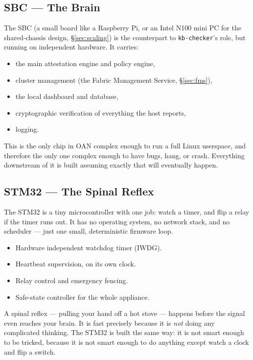 \documentclass[11pt,a4paper]{article}
\begin{document}
\subsection{SBC --- The Brain}
\label{sec:sbc}

The SBC (a small board like a Raspberry Pi, or an Intel N100 mini PC for
the shared-chassis design, \S\ref{sec:scaling}) is the counterpart to
\texttt{kb-checker}'s role, but running on independent hardware. It
carries:

\begin{itemize}
  \item the main attestation engine and policy engine,
  \item cluster management (the Fabric Management Service,
    \S\ref{sec:fms}),
  \item the local dashboard and database,
  \item cryptographic verification of everything the host reports,
  \item logging.
\end{itemize}

This is the only chip in OAN complex enough to run a full Linux
userspace, and therefore the only one complex enough to have bugs, hang,
or crash. Everything downstream of it is built assuming exactly that
will eventually happen.

\subsection{STM32 --- The Spinal Reflex}
\label{sec:stm32}

The STM32 is a tiny microcontroller with one job: watch a timer, and
flip a relay if the timer runs out. It has no operating system, no
network stack, and no scheduler --- just one small, deterministic
firmware loop.

\begin{itemize}
  \item Hardware independent watchdog timer (IWDG).
  \item Heartbeat supervision, on its own clock.
  \item Relay control and emergency fencing.
  \item Safe-state controller for the whole appliance.
\end{itemize}

\begin{analogybox}
A spinal reflex --- pulling your hand off a hot stove --- happens before
the signal even reaches your brain. It is fast precisely because it is
\emph{not} doing any complicated thinking. The STM32 is built the same
way: it is not smart enough to be tricked, because it is not smart
enough to do anything except watch a clock and flip a switch.
\end{analogybox}
\end{document}
